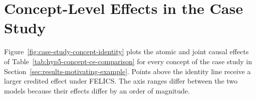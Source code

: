 \section{Concept-Level Effects in the Case Study}
\label{app:case-study-identity}

Figure~\ref{fig:case-study-concept-identity} plots the atomic and joint causal effects of Table~\ref{tab:hyp5-concept-ce-comparison} for every concept of the case study in Section~\ref{sec:results-motivating-example}. Points above the identity line receive a larger credited effect under FELICS. The axis ranges differ between the two models because their effects differ by an order of magnitude.


\newcommand{\HypFivePoint}[4]{%
  \addplot[only marks,mark=*,mark size=2.5pt,draw=#2,fill=#2]
    table[col sep=comma,x=#3,y=#4,
      restrict expr to domain={\thisrow{concept_id}}{#1:#1}]
    {data/rq5/concept_ce_identity.csv};%
}

\newcommand{\HypFiveIdentityPlot}[4]{%
  \begin{minipage}[t]{0.47\textwidth}
    \centering
    {\small\bfseries #1\par}
    \vspace{0.1em}
    \begin{tikzpicture}
      \begin{axis}[
        width=5.55cm,height=5.55cm,scale only axis,
        xmin=0,xmax=#4,ymin=0,ymax=#4,
        scaled ticks=false,
        xlabel={$\mathrm{CE}_{\mathrm{atomic}}$},
        ylabel={$\mathrm{CE}_{\mathrm{joint}}$},
        tick label style={font=\scriptsize,/pgf/number format/fixed,/pgf/number format/precision=2},
        label style={font=\scriptsize},
        grid=major,grid style={gray!18},axis line style={gray!60},
      ]
        \addplot[ResultScatterLine,very thick,dashed,domain=0:#4,samples=2] {x};
        \HypFivePoint{1}{HypFiveOne}{#2}{#3}
        \HypFivePoint{2}{HypFiveTwo}{#2}{#3}
        \HypFivePoint{3}{HypFiveThree}{#2}{#3}
        \HypFivePoint{4}{HypFiveFour}{#2}{#3}
        \HypFivePoint{5}{HypFiveFive}{#2}{#3}
        \HypFivePoint{6}{HypFiveSix}{#2}{#3}
        \HypFivePoint{7}{HypFiveSeven}{#2}{#3}
        \HypFivePoint{8}{HypFiveEight}{#2}{#3}
        \HypFivePoint{9}{HypFiveNine}{#2}{#3}
      \end{axis}
    \end{tikzpicture}
  \end{minipage}%
}

